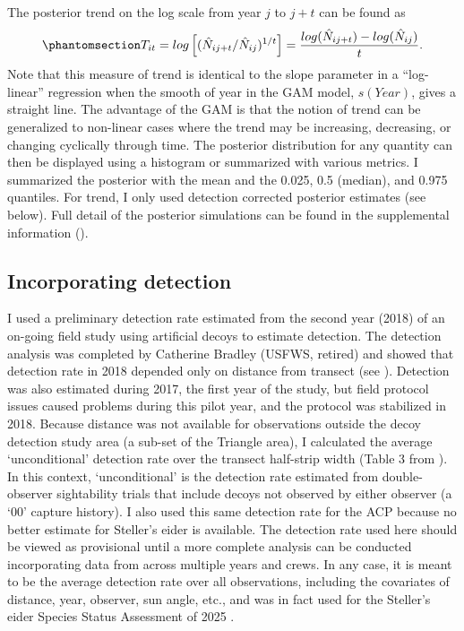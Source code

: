 \documentclass[
  10pt,
  letterpaper,
]{article}
\begin{document}
The posterior trend on the log scale from year \(j\) to \(j+t\) can be
found as
\begin{equation}\phantomsection\label{eq-6}{T_{it} = log \left[ (\hat N_{ij+t}/\hat N_{ij})^{1/t} \right] = \frac{log(\hat N_{ij+t}) - log(\hat N_{ij})}{t}.}\end{equation}
Note that this measure of trend is identical to the slope parameter in a
``log-linear'' regression when the smooth of year in the GAM model,
\(s(Year)\), gives a straight line. The advantage of the GAM is that the
notion of trend can be generalized to non-linear cases where the trend
may be increasing, decreasing, or changing cyclically through time. The
posterior distribution for any quantity can then be displayed using a
histogram or summarized with various metrics. I summarized the posterior
with the mean and the 0.025, 0.5 (median), and 0.975 quantiles. For
trend, I only used detection corrected posterior estimates (see below).
Full detail of the posterior simulations can be found in the
supplemental information ().

\subsection{Incorporating detection}\label{incorporating-detection}

I used a preliminary detection rate estimated from the second year
(2018) of an on-going field study using artificial decoys to estimate
detection. The detection analysis was completed by Catherine Bradley
(USFWS, retired) and showed that detection rate in 2018 depended only on
distance from transect (see ). Detection was also
estimated during 2017, the first year of the study, but field protocol
issues caused problems during this pilot year, and the protocol was
stabilized in 2018. Because distance was not available for observations
outside the decoy detection study area (a sub-set of the Triangle area),
I calculated the average `unconditional' detection rate over the
transect half-strip width (Table 3 from ). In this
context, `unconditional' is the detection rate estimated from
double-observer sightability trials that include decoys not observed by
either observer (a `00' capture history). I also used this same
detection rate for the ACP because no better estimate for Steller's
eider is available. The detection rate used here should be viewed as
provisional until a more complete analysis can be conducted
incorporating data from across multiple years and crews. In any case, it
is meant to be the average detection rate over all observations,
including the covariates of distance, year, observer, sun angle, etc.,
and was in fact used for the Steller's eider Species Status Assessment
of 2025 \citep{steiSSA2025}.
\end{document}
